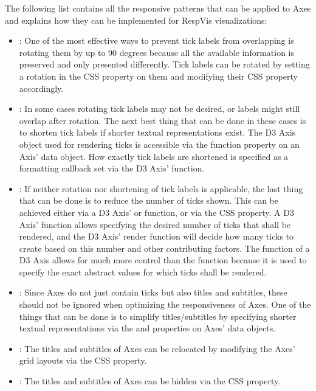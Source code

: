 The following list contains all the responsive patterns that can be
applied to Axes and explains how they can be implemented for RespVis
visualizations:
\begin{itemize}
\item {}: One of the most effective ways to
  prevent tick labels from overlapping is rotating them by up to 90
  degrees because all the available information is preserved and only
  presented differently.  Tick labels can be rotated by setting a
  rotation in the CSS  property on them and modifying
  their CSS  property accordingly.

\item {}: In some cases rotating tick
  labels may not be desired, or labels might still overlap after
  rotation.  The next best thing that can be done in these cases is to
  shorten tick labels if shorter textual representations exist.  The
  D3 Axis object used for rendering ticks is accessible via the
   function property on an Axis' data object.  How
  exactly tick labels are shortened is specified as a formatting
  callback set via the D3 Axis'  function.

\item {}: If neither rotation nor shortening of
  tick labels is applicable, the last thing that can be done is to
  reduce the number of ticks shown. This can be achieved either via a
  D3 Axis'  or  function, or via the CSS
   property. A D3 Axis'  function allows
  specifying the desired number of ticks that shall be rendered, and
  the D3 Axis' render function will decide how many ticks to create
  based on this number and other contributing factors.  The
   function of a D3 Axis allows for much more control
  than the  function because it is used to specify the
  exact abstract values for which ticks shall be rendered.

\item {}: Since Axes do not just
  contain ticks but also titles and subtitles, these should not be
  ignored when optimizing the responsiveness of Axes.  One of the
  things that can be done is to simplify titles/subtitles by
  specifying shorter textual representations via the  and
   properties on Axes' data objects.

\item {}: The titles and subtitles of
  Axes can be relocated by modifying the Axes' grid layouts via the
  CSS  property.

\item {}: The titles and subtitles of
  Axes can be hidden via the CSS  property.
\end{itemize}





